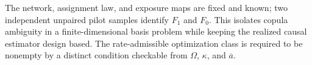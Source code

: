 The network, assignment law, and exposure maps are fixed and known; two independent unpaired pilot samples identify \(F_1\) and \(F_0\).  This isolates copula ambiguity in a finite-dimensional basis problem while keeping the realized causal estimator design based.  The rate-admissible optimization class is required to be nonempty by a distinct condition checkable from \(\Omega\), \(\kappa\), and \(\overline a\).